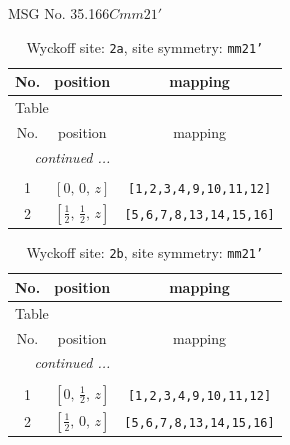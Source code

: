 \documentclass[fleqn,8pt]{jsarticle}
\begin{document}
\setcounter{MaxMatrixCols}{32}

\renewcommand{\tablename}{Table~}
\renewcommand{\figurename}{Figure~}
\begin{center}
\LARGE
MSG No. 35.166\quad$Cmm21'$
\end{center}
\renewcommand{\arraystretch}{1.2}
\begin{longtable}{ccc}
\caption{Wyckoff site: {\tt 2a}, site symmetry: {\tt mm21'}}
 \\
 \hline \hline
No. & position & mapping \\ \hline \endfirsthead

\multicolumn{2}{l}{\tablename\ \thetable{}} \\
 \hline \hline
No. & position & mapping \\ \hline \endhead

 \hline \hline
\multicolumn{2}{r}{\footnotesize\it continued ...} \\ \endfoot

 \hline \hline
\multicolumn{2}{r}{} \\ \endlastfoot

1 & $\left[ 0,\, 0,\, z \right]$ & {\tt [1,2,3,4,9,10,11,12]} \\ \hline
2 & $\left[ \frac{1}{2},\, \frac{1}{2},\, z \right]$ & {\tt [5,6,7,8,13,14,15,16]} \\
\end{longtable}
\renewcommand{\arraystretch}{1.2}
\begin{longtable}{ccc}
\caption{Wyckoff site: {\tt 2b}, site symmetry: {\tt mm21'}}
 \\
 \hline \hline
No. & position & mapping \\ \hline \endfirsthead

\multicolumn{2}{l}{\tablename\ \thetable{}} \\
 \hline \hline
No. & position & mapping \\ \hline \endhead

 \hline \hline
\multicolumn{2}{r}{\footnotesize\it continued ...} \\ \endfoot

 \hline \hline
\multicolumn{2}{r}{} \\ \endlastfoot

1 & $\left[ 0,\, \frac{1}{2},\, z \right]$ & {\tt [1,2,3,4,9,10,11,12]} \\ \hline
2 & $\left[ \frac{1}{2},\, 0,\, z \right]$ & {\tt [5,6,7,8,13,14,15,16]} \\
\end{longtable}
\end{document}
